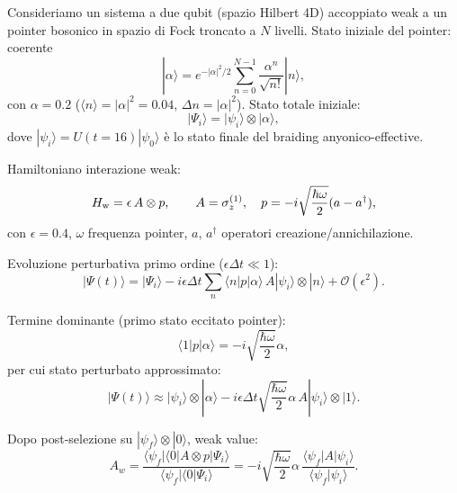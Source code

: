 \documentclass[11pt,a4paper]{article}
\theoremstyle{plain}
\theoremstyle{definition}
\begin{document}
Consideriamo un sistema a due qubit (spazio Hilbert 4D) accoppiato weak a un pointer bosonico in spazio di Fock troncato a $N$ livelli. Stato iniziale del pointer: coerente
\begin{equation}
    |\alpha\rangle = e^{-|\alpha|^2/2} \sum_{n=0}^{N-1} \frac{\alpha^n}{\sqrt{n!}} |n\rangle,
    \label{eq:coherent_state}
\end{equation}
con $\alpha = 0.2$ ($\langle n \rangle = |\alpha|^2 = 0.04$, $\Delta n = |\alpha|^2$). Stato totale iniziale:
\begin{equation}
    |\Psi_i\rangle = |\psi_i\rangle \otimes |\alpha\rangle,
    \label{eq:initial_state}
\end{equation}
dove $|\psi_i\rangle = U(t=16) |\psi_0\rangle$ è lo stato finale del braiding anyonico-effective.

Hamiltoniano interazione weak:
\begin{equation}
    H_{\rm w} = \epsilon \, A \otimes p, \qquad A = \sigma_z^{(1)}, \quad p = -i \sqrt{\frac{\hbar \omega}{2}} (a - a^\dagger),
    \label{eq:weak_H}
\end{equation}
con $\epsilon = 0.4$, $\omega$ frequenza pointer, $a$, $a^\dagger$ operatori creazione/annichilazione.

Evoluzione perturbativa primo ordine ($\epsilon \Delta t \ll 1$):
\begin{equation}
    |\Psi(t)\rangle = |\Psi_i\rangle - i \epsilon \Delta t \sum_n \langle n | p | \alpha \rangle \, A |\psi_i\rangle \otimes |n\rangle + \mathcal{O}(\epsilon^2).
    \label{eq:pert_evol}
\end{equation}

Termine dominante (primo stato eccitato pointer):
\begin{equation}
    \langle 1 | p | \alpha \rangle = -i \sqrt{\frac{\hbar \omega}{2}} \alpha,
    \label{eq:p_matrix}
\end{equation}
per cui stato perturbato approssimato:
\begin{equation}
    |\Psi(t)\rangle \approx |\psi_i\rangle \otimes |\alpha\rangle - i \epsilon \Delta t \sqrt{\frac{\hbar \omega}{2}} \alpha \, A |\psi_i\rangle \otimes |1\rangle.
    \label{eq:approx_pert}
\end{equation}

Dopo post-selezione su $|\psi_f\rangle \otimes |0\rangle$, weak value:
\begin{equation}
    A_w = \frac{\langle \psi_f | \langle 0 | A \otimes p | \Psi_i \rangle}{\langle \psi_f | \langle 0 | \Psi_i \rangle} = -i \sqrt{\frac{\hbar \omega}{2}} \alpha \, \frac{\langle \psi_f | A | \psi_i \rangle}{\langle \psi_f | \psi_i \rangle}.
    \label{eq:weak_value}
\end{equation}
\end{document}
